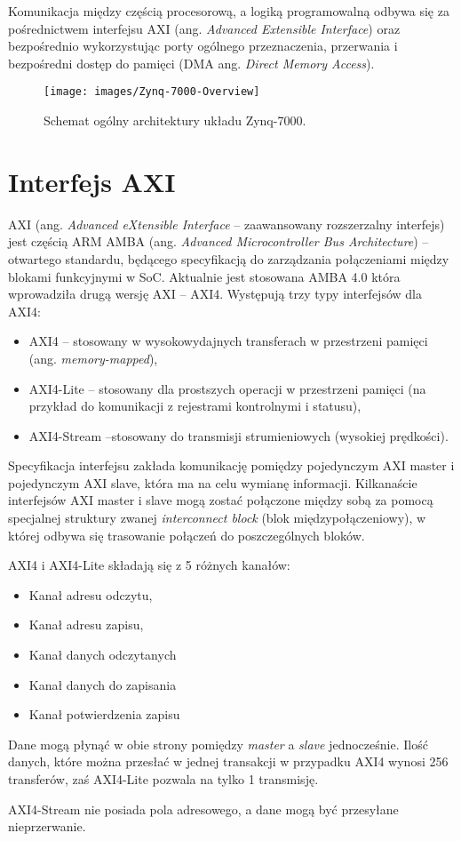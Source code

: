 Komunikacja między częścią procesorową, a logiką programowalną odbywa się za pośrednictwem interfejsu AXI (ang. \textit{Advanced Extensible Interface}) oraz bezpośrednio wykorzystując porty ogólnego przeznaczenia, przerwania i bezpośredni dostęp do pamięci (DMA ang. \textit{Direct Memory Access}).

\begin{figure}[h]
    \centering
    \texttt{[image: images/Zynq-7000-Overview]}
    \caption{Schemat ogólny architektury układu Zynq-7000.}
    \label{fig:zynq7000}
\end{figure}

\section{Interfejs AXI}
 AXI (ang. \textit{Advanced eXtensible Interface} --  zaawansowany rozszerzalny interfejs) jest częścią ARM AMBA (ang.\textit{ Advanced Microcontroller Bus Architecture}) -- otwartego standardu, będącego specyfikacją do zarządzania połączeniami między blokami funkcyjnymi w SoC. 
 Aktualnie jest stosowana AMBA 4.0 która wprowadziła drugą wersję AXI -- AXI4. 
 Występują trzy typy interfejsów dla AXI4:
\begin{itemize}
\item AXI4 -- stosowany w wysokowydajnych transferach w przestrzeni pamięci (ang. \textit{memory-mapped}),
\item AXI4-Lite -- stosowany dla prostszych operacji w przestrzeni pamięci (na przykład do komunikacji z rejestrami kontrolnymi i statusu),
\item AXI4-Stream --stosowany do transmisji strumieniowych (wysokiej prędkości). 
\end{itemize}
Specyfikacja interfejsu zakłada komunikację pomiędzy pojedynczym AXI master i pojedynczym AXI slave, która ma na celu wymianę informacji. 
Kilkanaście interfejsów AXI master i slave mogą zostać połączone między sobą za pomocą specjalnej struktury zwanej \textit{interconnect block} (blok międzypołączeniowy), w której odbywa się trasowanie połączeń do poszczególnych bloków. 

AXI4 i AXI4-Lite składają się z 5 różnych kanałów:
\begin{itemize}
\item Kanał adresu odczytu,
\item Kanał adresu zapisu,
\item Kanał danych odczytanych
\item Kanał danych do zapisania
\item Kanał potwierdzenia zapisu
\end{itemize}
Dane mogą płynąć w obie strony pomiędzy \textit{master} a \textit{slave} jednocześnie.
Ilość danych, które można przesłać w jednej transakcji w przypadku AXI4 wynosi 256 transferów, zaś AXI4-Lite pozwala na tylko 1 transmisję.



AXI4-Stream nie posiada pola adresowego, a dane mogą być przesyłane nieprzerwanie. 